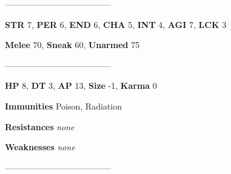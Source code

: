 \documentclass[11pt,a4paper,twocolumn]{book}
\begin{document}
	--------------------------------------

	\noindent
	\textbf{STR} 7, \textbf{PER} 6, \textbf{END} 6, \textbf{CHA} 5, \textbf{INT} 4, \textbf{AGI} 7, \textbf{LCK} 3
	
	\noindent
	\textbf{Melee} 70, \textbf{Sneak} 60, \textbf{Unarmed} 75
	
	--------------------------------------
	
	\noindent
	\textbf{HP} 8, \textbf{DT} 3, \textbf{AP} 13, \textbf{Size} -1, \textbf{Karma} 0
	
	
	\noindent
	\textbf{Immunities} Poison, Radiation%
	
	\noindent
	\textbf{Resistances} \emph{none} %
	
	\noindent
	\textbf{Weaknesses} \emph{none} %
	
	--------------------------------------
	
	
\end{document}
